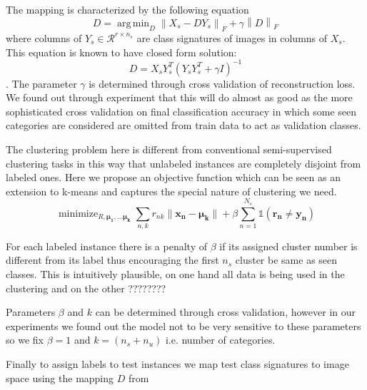 \documentclass[wcp]{jmlr}
\newcommand{\norm}[1]{\left \lVert #1 \right \rVert_{F}}
\DeclareMathOperator*{\argmin}{arg\,min}
\DeclareMathOperator*{\minimize}{minimize}
\begin{document}
The mapping is characterized by the following equation
\begin{equation}
  D = \argmin_D \norm{X_s - D Y_s} + \gamma \norm{D}
\end{equation}
where columns of $ Y_s \in \mathcal{R}^{r \times n_s} $  are class signatures of images in columns of $X_s$.
This equation is known to have closed form solution:
\begin{equation} \label{eq:dic}
  D = X_s Y_s^T (Y_s Y_s^T + \gamma I)^{-1}
\end{equation}.
The parameter $\gamma$ is determined through cross validation of reconstruction loss. We found out through experiment that
this will do almost as good as the more sophisticated
 cross validation on final classification accuracy in which some seen categories are considered are omitted
 from train data to act as validation classes.

The clustering problem here is different from conventional semi-supervised clustering tasks \cite{}
in this way that unlabeled instances are completely disjoint from labeled ones. Here we propose an objective function which
can be seen as an extension to k-means and captures the special nature of clustering we need.
\begin{equation}
\minimize_{R, \mathbf{\mu_1, \ldots \mu_k }}  \sum_{n,k} r_{nk} \lVert \mathbf{x_n - \mu_k} \rVert +
 \beta \sum_{n=1}^{N_s} \mathds{1}(\mathbf{r_n \neq y_n})
\end{equation}

For each labeled instance there is a penalty of $\beta$ if its assigned cluster number is different from its label thus encouraging
the first $n_s$ cluster be same as seen classes. This is intuitively plausible, on one hand all data is being used
in the clustering and on the other ????????

Parameters $\beta$ and $k$ can be determined through cross validation, however in our experiments we found out
the model not to be very sensitive to these parameters so we fix $\beta=1$ and $k =  (n_s + n_u)$ i.e. number of categories.

Finally to assign labels to test instances we map test class signatures to image space using the mapping $D$
from \mathref{}
\end{document}
